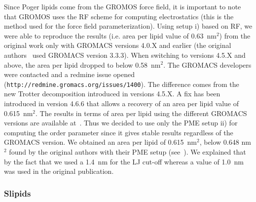 \documentclass[pre,aps,floatfix,authordate1-4,twocolumn]{revtex4-1}
\begin{document}
Since Poger lipids come from the GROMOS force field, it is important to note that GROMOS uses the RF scheme for computing electrostatics (this is the method used for the 
force field parameterization). Using setup i) based on RF, we were able to reproduce the results (i.e. area per lipid value of 0.63~nm$^2$) from the original work only with 
GROMACS versions 4.0.X and earlier (the original authors~\cite{poger10} used GROMACS version 3.3.3). When switching to versions 4.5.X and above, the area per lipid dropped to below 0.58~nm$^2$. 
The GROMACS developers were contacted and a redmine issue opened (\texttt{http://redmine.gromacs.org/issues/1400}). The difference comes from the new Trotter decomposition 
introduced in versions 4.5.X. A fix has been introduced in version 4.6.6 that allows a recovery of an area per lipid value of 0.615~nm$^2$. The results in terms of area per lipid using the different 
GROMACS versions are available at~\cite{fuchs14}.
Thus we decided to use only the PME setup ii) for computing the order parameter since it gives stable results regardless of the GROMACS version. We obtained an area per 
lipid of 0.615~nm$^2$, below 0.648 nm$^2$ found by the original authors with their PME setup (see~\cite{poger12}). We explained that by the fact that we used 
a 1.4~nm for the LJ cut-off whereas a value of 1.0~nm was used in the original publication. 

\subsubsection{Slipids}
\end{document}
